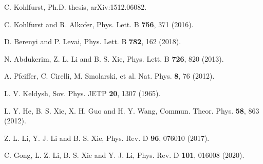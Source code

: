 \documentclass[aps,preprint,superscriptaddress]{revtex4}
\begin{document}
\begin{thebibliography}{99}


C. Kohlfurst, Ph.D. thesis, arXiv:1512.06082.
%

C. Kohlfurst and R. Alkofer,
Phys. Lett. B {\textbf{756}}, 371 (2016).


D. Berenyi and P. Levai,
Phys. Lett. B {\textbf{782}}, 162 (2018).
%

N. Abdukerim, Z. L. Li and B. S. Xie,
Phys. Lett. B {\textbf{726}}, 820 (2013).

A. Pfeiffer, C. Cirelli, M. Smolarski, et al.
Nat. Phys. {\textbf 8}, 76 (2012).


L. V. Keldysh,
Sov. Phys. JETP {\textbf{20}}, 1307 (1965).


L. Y. He, B. S. Xie, X. H. Guo and H. Y. Wang,
Commun. Theor. Phys. {\textbf{58}}, 863 (2012).

Z. L. Li, Y. J. Li and B. S. Xie,
Phys. Rev. D {\textbf{96}}, 076010 (2017).
%

C. Gong, L. Z. Li, B. S. Xie and Y. J. Li,
Phys. Rev. D {\textbf{101}}, 016008 (2020).




\end{thebibliography}
\end{document}
